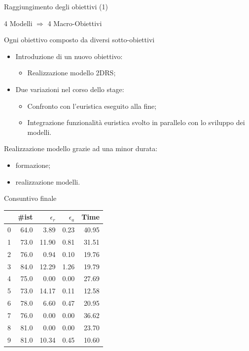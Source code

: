 \documentclass{beamer}
\begin{document}
\begin{frame}{Raggiungimento degli obiettivi (1)}
	\begin{center}
		4 Modelli $\Rightarrow$ 4 Macro-Obiettivi
	\end{center}
	
	Ogni obiettivo composto da diversi sotto-obiettivi
	\begin{itemize}
		\item Introduzione di un nuovo obiettivo:
		      \begin{itemize}
		      	\item Realizzazione modello 2DRS;
		      \end{itemize}
		\item Due variazioni nel corso dello stage:
		      \begin{itemize}
		      	\item Confronto con l'euristica eseguito alla fine;
		      	\item Integrazione funzionalità euristica svolto in parallelo con lo sviluppo dei modelli.
		      \end{itemize}
	\end{itemize}
	Realizzazione modello grazie ad una minor durata:
	\begin{itemize}
		\item formazione;
		\item realizzazione modelli.
	\end{itemize}
\end{frame}

\begin{frame}{Consuntivo finale}
	\begin{center}
		\begin{tabular}{l |r|r|r|r}
			{} & \#ist & $\epsilon_r$ & $\epsilon_a$ & Time  \\
			\hline
			0  & 64.0  & 3.89         & 0.23         & 40.95 \\
			1  & 73.0  & 11.90        & 0.81         & 31.51 \\
			2  & 76.0  & 0.94         & 0.10         & 19.76 \\
			3  & 84.0  & 12.29        & 1.26         & 19.79 \\
			4  & 75.0  & 0.00         & 0.00         & 27.69 \\
			5  & 73.0  & 14.17        & 0.11         & 12.58 \\
			6  & 78.0  & 6.60         & 0.47         & 20.95 \\
			7  & 76.0  & 0.00         & 0.00         & 36.62 \\
			8  & 81.0  & 0.00         & 0.00         & 23.70 \\
			9  & 81.0  & 10.34        & 0.45         & 10.60 \\
		\end{tabular}
	\end{center}
\end{frame}
\end{document}
